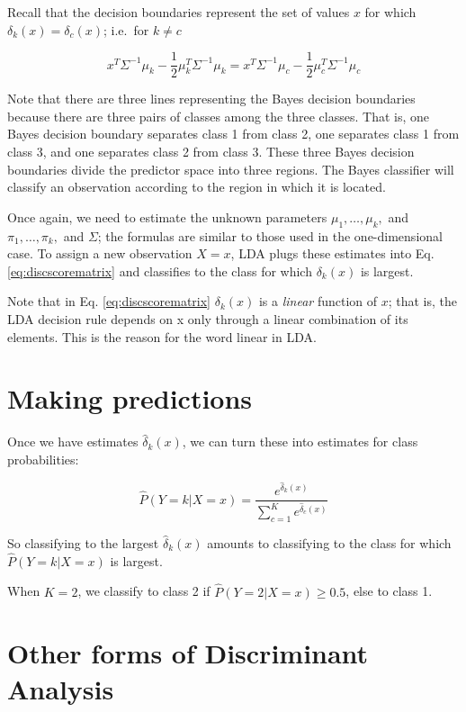 \documentclass[]{book}
\begin{document}
Recall that the decision boundaries represent the set of values \(x\)
for which \(\delta_k(x)=\delta_c(x)\); i.e.~for \(k\neq c\)

\[ x^T \Sigma^{-1} \mu_k - \frac{1}{2} \mu_k^T \Sigma^{-1}  \mu_k = x^T \Sigma^{-1} \mu_c - \frac{1}{2} \mu_c^T \Sigma^{-1}  \mu_c  \]

Note that there are three lines representing the Bayes decision
boundaries because there are three pairs of classes among the three
classes. That is, one Bayes decision boundary separates class 1 from
class 2, one separates class 1 from class 3, and one separates class 2
from class 3. These three Bayes decision boundaries divide the predictor
space into three regions. The Bayes classiﬁer will classify an
observation according to the region in which it is located.

Once again, we need to estimate the unknown parameters
\(\mu_1,\ldots,\mu_k,\) and \(\pi_1,\ldots,\pi_k,\) and \(\Sigma\); the
formulas are similar to those used in the one-dimensional case. To
assign a new observation \(X = x\), LDA plugs these estimates into Eq.
\eqref{eq:discscorematrix} and classiﬁes to the class for which
\(\delta_k(x)\) is largest.

Note that in Eq. \eqref{eq:discscorematrix} \(\delta_k(x)\) is a
\emph{linear} function of \(x\); that is, the LDA decision rule depends
on x only through a linear combination of its elements. This is the
reason for the word linear in LDA.

\section{Making predictions}\label{making-predictions}

Once we have estimates \(\hat{\delta}_k(x)\), we can turn these into
estimates for class probabilities:

\[ \hat{P}(Y=k|X=x)= \frac{e^{\hat{\delta}_k(x)}}{\sum_{c=1}^K e^{\hat{\delta}_c(x)}} \]

So classifying to the largest \(\hat{\delta}_k(x)\) amounts to
classifying to the class for which \(\hat{P}(Y=k|X=x)\) is largest.

When \(K=2\), we classify to class 2 if \(\hat{P}(Y=2|X=x) \geq 0.5\),
else to class 1.

\section{Other forms of Discriminant
Analysis}\label{other-forms-of-discriminant-analysis}
\end{document}
